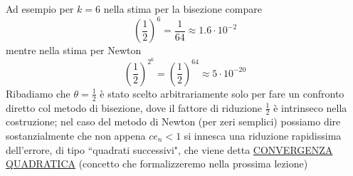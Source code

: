 Ad esempio per $k=6$ nella stima per la bisezione compare
\[\left(\frac{1}{2}\right)^{6}=\frac{1}{64}\approx 1.6\cdot10^{-2}\]
mentre nella stima per Newton
\[\left(\frac{1}{2}\right)^{2^6}=\left(\frac{1}{2}\right)^{64}\approx 5\cdot10^{-20}\]
Ribadiamo che $\theta=\frac{1}{2}$ è stato scelto arbitrariamente solo per fare un confronto diretto col metodo di bisezione, dove il fattore di riduzione $\frac{1}{2}$ è intrinseco nella costruzione; nel caso del metodo di Newton (per zeri semplici) possiamo dire sostanzialmente che non appena $ce_n<1$ si innesca una riduzione rapidissima dell'errore, di tipo ``quadrati successivi", che viene detta \uline{CONVERGENZA QUADRATICA} (concetto che formalizzeremo nella prossima lezione)
\newpage
